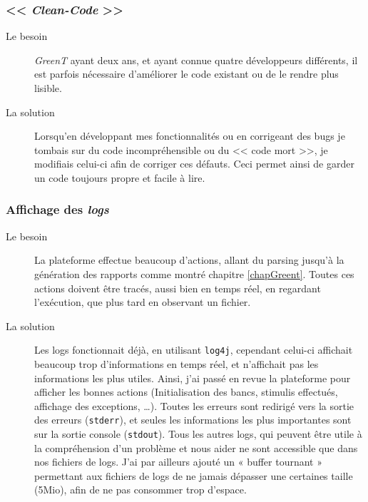 	\subsubsection{<< \textit{Clean-Code} >>}
		\begin{description}
			\item[Le besoin] \textit{GreenT} ayant deux ans, et ayant connue quatre développeurs différents, il est parfois nécessaire d'améliorer le code existant ou de le rendre plus lisible. 
			\item[La solution] Lorsqu'en développant mes fonctionnalités ou en corrigeant des bugs je tombais sur du code incompréhensible ou du << code mort >>, je modifiais celui-ci afin de corriger ces défauts. Ceci permet ainsi de garder un code toujours propre et facile à lire.
		\end{description}
		
	\subsubsection{Affichage des \textit{logs}}
		\begin{description}
			\item[Le besoin] La plateforme effectue beaucoup d'actions, allant du parsing jusqu'à la génération des rapports comme montré chapitre \ref{chapGreent}. Toutes ces actions doivent être tracés, aussi bien en temps réel, en regardant l'exécution, que plus tard en observant un fichier.
			\item[La solution] Les logs fonctionnait déjà, en utilisant \texttt{log4j}, cependant celui-ci affichait beaucoup trop d'informations en temps réel, et n'affichait pas les informations les plus utiles. Ainsi, j'ai passé en revue la plateforme pour afficher les bonnes actions (Initialisation des bancs, stimulis effectués, affichage des exceptions, \ldots). Toutes les erreurs sont redirigé vers la sortie des erreurs (\texttt{stderr}), et seules les informations les plus importantes sont sur la sortie console (\texttt{stdout}). Tous les autres logs, qui peuvent être utile à la compréhension d'un problème et nous aider ne sont accessible que dans nos fichiers de logs. J'ai par ailleurs ajouté un « buffer tournant » permettant aux fichiers de logs de ne jamais dépasser une certaines taille (5Mio), afin de ne pas consommer trop d'espace.
		\end{description}
		

